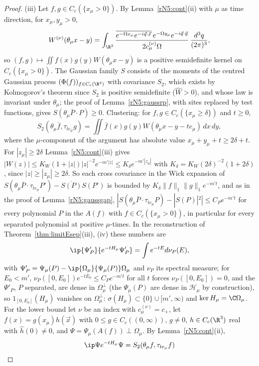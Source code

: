 \begin{proof}
(iii) Let $f,g\in C_c(\{x_\mu>0\})$. By Lemma~\ref{rN5:cont}(ii) with $\mu$ as
time direction, for $x_\mu,y_\mu>0$,
\[
W^{(\nu)}(\theta_\mu x-y)=\int_{\R^3}\frac{\overline{e^{-\Omega x_\mu}
e^{-i\vec q\cdot\vec x}}\,e^{-\Omega y_\mu}e^{-i\vec q\cdot\vec y}}
{2c^{(\nu)}_\mu\Omega}\,\frac{d^3q}{(2\pi)^3},
\]
so $(f,g)\mapsto\iint f(x)g(y)
W(\theta_\mu x-y)$ is a positive semidefinite kernel on $C_c(\{x_\mu>0\})$.
The Gaussian family $S$ consists of the moments of the centred Gaussian
process $(\Phi(f))_{f\in C_c(\R^4)}$ with covariance $S_2$, which exists by
Kolmogorov's theorem since $S_2$ is positive semidefinite
($\hat W>0$), and whose law is invariant under $\theta_\mu$; the proof of
Lemma~\ref{rN5:gaussrp}, with sites replaced by test functions, gives $S(\theta_\mu\bar P\cdot P)\ge0$. Clustering: for $f,g
\in C_c(\{x_\mu\ge\delta\})$ and $t\ge0$,
\[
S_2(\theta_\mu\bar f,\tau_{te_\mu}g)=\iint\bar f(x)g(y)W(\theta_\mu x-y-te_\mu)
\,dx\,dy,
\]
where the $\mu$-component of the
argument has absolute value $x_\mu+y_\mu+t\ge2\delta+t$. For $|z_\mu|\ge
2\delta$ Lemma~\ref{rN5:cont}(iii) gives $|W(z)|\le K_W(1+|z|)|z|^{-2}e^{-m'
|z|}\le K_\delta e^{-m'|z_\mu|}$ with $K_\delta=K_W(2\delta)^{-2}(1+2\delta)$,
since $|z|\ge|z_\mu|\ge2\delta$. So each cross covariance in the Wick
expansion of $S(\theta_\mu\bar P\cdot\tau_{te_\mu}P')-\overline{S(P)}S(P')$ is
bounded by $K_\delta\|f\|_1\|g\|_1e^{-m't}$, and as in the proof of
Lemma~\ref{rN5:gaussgap}, $|S(\theta_\mu\bar P\cdot\tau_{te_\mu}P)-|S(P)|^2|
\le C_Pe^{-m't}$ for every polynomial $P$ in the $A(f)$ with $f\in C_c(\{x_\mu
>0\})$, in particular for every separated polynomial at positive $\mu$-times.
In the reconstruction of Theorem~\ref{thm:limitEsep}(iii), (iv) these numbers
are
\[
\ip{\Psi'_P}{e^{-tH_\mu}\Psi'_P}=\int e^{-tE}d\nu_P(E),
\]
with $\Psi'_P=\Psi_\mu(P)-\ip{\Omega_\mu}{\Psi_\mu(P)}\Omega_\mu$ and $\nu_P$ its spectral
measure; for $E_0<m'$, $\nu_P([0,E_0])e^{-tE_0}\le C_Pe^{-m't}$ for all $t$
forces $\nu_P([0,E_0])=0$, and the $\Psi'_P$, $P$ separated, are dense in
$\Omega_\mu^\perp$ (the $\Psi_\mu(P)$ are dense in $\mathcal H_\mu$ by
construction), so $1_{[0,E_0]}(H_\mu)$ vanishes on $\Omega_\mu^\perp$:
$\sigma(H_\mu)\subset\{0\}\cup[m',\infty)$ and $\ker H_\mu=\C\Omega_\mu$.
For the lower bound let $\nu$ be
an index with $c^{(\nu)}_\mu=c_+$, let $f(x)=g(x_\mu)h(\vec x)$ with $0\le g\in
C_c((0,\infty))$, $g\ne0$, $h\in C_c(\R^3)$ real with $\hat h(0)\ne0$, and
$\Psi=\Psi_\mu(A(f))\perp\Omega_\mu$. By Lemma~\ref{rN5:cont}(ii),
\[
\begin{split}
\ip\Psi{e^{-tH_\mu}\Psi}&=S_2(\theta_\mu f,\tau_{te_\mu}f)\\

\end{split}\]
\end{proof}
